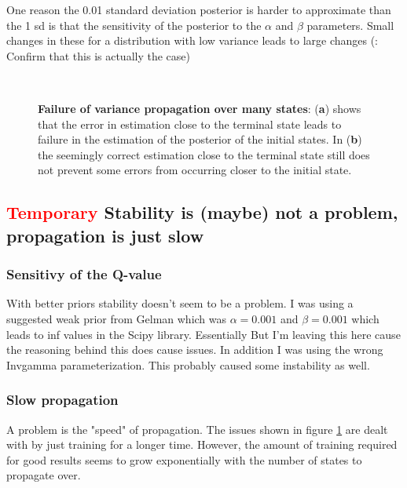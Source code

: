 One reason the 0.01 standard deviation posterior is harder to approximate than the 1 sd is that the sensitivity of the posterior to the $\alpha$ and $\beta$ parameters. Small changes in these for a distribution with low variance leads to large changes (\todo: Confirm that this is actually the case)


\begin{figure}[H]
    \centering
    \\

    \caption{\textbf{Failure of variance propagation over many states}: (\textbf{a}) shows that the error in estimation close to the terminal state leads to failure in the estimation of the posterior of the initial states. In (\textbf{b}) the seemingly correct estimation close to the terminal state still does not prevent some errors from occurring closer to the initial state.}
    \label{fig:longproptest}
\end{figure}

\subsection{\textcolor{red}{Temporary} Stability is (maybe) not a problem, propagation is just slow}

\subsubsection{Sensitivy of the Q-value}

With better priors stability doesn't seem to be a problem. I was using a suggested weak prior from Gelman which was $\alpha=0.001$ and $\beta=0.001$ which leads to inf values in the Scipy library. Essentially But I'm leaving this here cause the reasoning behind this does cause issues. In addition I was using the wrong Invgamma parameterization. This probably caused some instability as well.

\subsubsection{Slow propagation}

A problem is the "speed" of propagation. The issues shown in figure \ref{fig:longproptest} are dealt with by just training for a longer time. However, the amount of training required for good results seems to grow exponentially with the number of states to propagate over.

